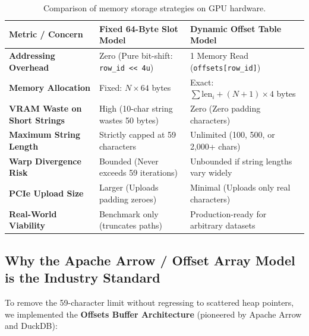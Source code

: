 \documentclass[a4paper,11pt]{article}
\begin{document}
\begin{table}[htbp]
\centering
\small
\begin{tabular}{@{}lll@{}}
\toprule
\textbf{Metric / Concern} & \textbf{Fixed 64-Byte Slot Model} & \textbf{Dynamic Offset Table Model} \\
\midrule
\textbf{Addressing Overhead} & Zero (Pure bit-shift: \texttt{row\_id << 4u}) & 1 Memory Read (\texttt{offsets[row\_id]}) \\
\textbf{Memory Allocation} & Fixed: $N \times 64$ bytes & Exact: $\sum \text{len}_i + (N+1) \times 4$ bytes \\
\textbf{VRAM Waste on Short Strings} & High (10-char string wastes 50 bytes) & Zero (Zero padding characters) \\
\textbf{Maximum String Length} & Strictly capped at 59 characters & Unlimited (100, 500, or 2,000+ chars) \\
\textbf{Warp Divergence Risk} & Bounded (Never exceeds 59 iterations) & Unbounded if string lengths vary widely \\
\textbf{PCIe Upload Size} & Larger (Uploads padding zeroes) & Minimal (Uploads only real characters) \\
\textbf{Real-World Viability} & Benchmark only (truncates paths) & Production-ready for arbitrary datasets \\
\bottomrule
\end{tabular}
\caption{Comparison of memory storage strategies on GPU hardware.}
\label{tab:tradeoffs}
\end{table}

\subsection{Why the Apache Arrow / Offset Array Model is the Industry Standard}

To remove the 59-character limit without regressing to scattered heap pointers, we implemented the \textbf{Offsets Buffer Architecture} (pioneered by Apache Arrow and DuckDB):
\end{document}
